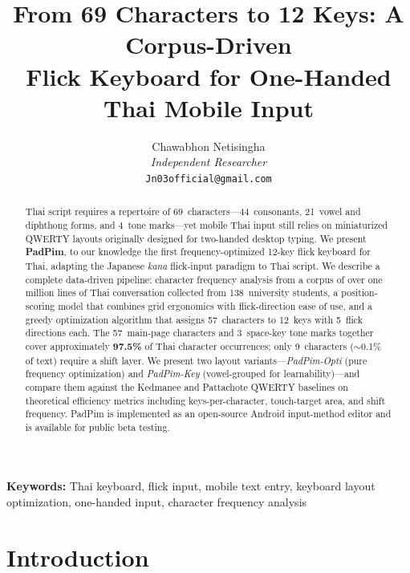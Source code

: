 \documentclass[10pt,twocolumn,a4paper]{article}
\makeatletter
\renewcommand{\maketitle}{%
  \twocolumn[%
    \begin{center}
      {\LARGE\bfseries \@title \par}
      \vskip 1em
      {\large \@author \par}
      \vskip 0.5em
      {\normalsize \@date \par}
      \vskip 1.5em
    \end{center}
  ]%
}
\makeatother
\begin{document}
\title{From 69 Characters to 12 Keys: A Corpus-Driven\\
Flick Keyboard for One-Handed Thai Mobile Input}

\author{
  Chawabhon Netisingha\\
  \textit{Independent Researcher}\\
  \texttt{Jn03official@gmail.com}
}

\date{}
\maketitle

\begin{abstract}
Thai script requires a repertoire of 69~characters---44~consonants, 21~vowel and diphthong forms, and 4~tone marks---yet mobile Thai input still relies on miniaturized QWERTY layouts originally designed for two-handed desktop typing.
We present \textbf{PadPim}, to our knowledge the first frequency-optimized 12-key flick keyboard for Thai, adapting the Japanese \emph{kana} flick-input paradigm to Thai script.
We describe a complete data-driven pipeline: character frequency analysis from a corpus of over one million lines of Thai conversation collected from 138~university students, a position-scoring model that combines grid ergonomics with flick-direction ease of use, and a greedy optimization algorithm that assigns 57~characters to 12~keys with 5~flick directions each.
The 57~main-page characters and 3~space-key tone marks together cover approximately \textbf{97.5\%} of Thai character occurrences; only 9~characters ($\sim$0.1\% of text) require a shift layer.
We present two layout variants---\emph{PadPim-Opti} (pure frequency optimization) and \emph{PadPim-Key} (vowel-grouped for learnability)---and compare them against the Kedmanee and Pattachote QWERTY baselines on theoretical efficiency metrics including keys-per-character, touch-target area, and shift frequency.
PadPim is implemented as an open-source Android input-method editor and is available for public beta testing.
\end{abstract}

\medskip
\noindent\textbf{Keywords:} Thai keyboard, flick input, mobile text entry, keyboard layout optimization, one-handed input, character frequency analysis

\section{Introduction}
\label{sec:intro}
\end{document}
